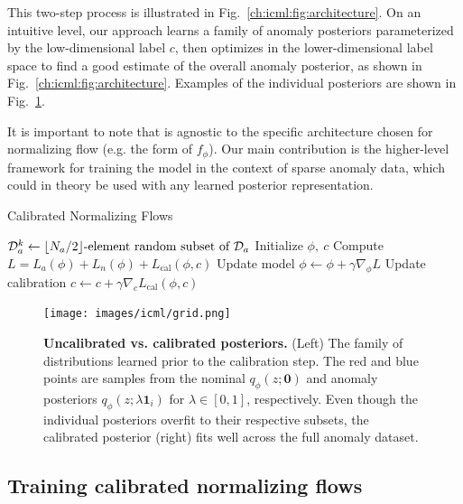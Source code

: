 This two-step process is illustrated in Fig.~\ref{ch:icml:fig:architecture}. On an intuitive level, our approach learns a family of anomaly posteriors parameterized by the low-dimensional label $c$, then optimizes in the lower-dimensional label space to find a good estimate of the overall anomaly posterior, as shown in Fig.~\ref{ch:icml:fig:architecture}. Examples of the individual posteriors are shown in Fig.~\ref{ch:icml:fig:grid}.

It is important to note that \ouralg{} is agnostic to the specific architecture chosen for normalizing flow (e.g. the form of $f_\phi$). Our main contribution is the higher-level framework for training the model in the context of sparse anomaly data, which could in theory be used with any learned posterior representation.

\begin{algorithm}[H]
    \caption{Calibrated Normalizing Flows}
    \label{ch:icml:alg:calnf}
    \DontPrintSemicolon
    {
        $\mathcal{D}_a^k \gets \text{$\lfloor N_a/2 \rfloor$-element random subset of } \mathcal{D}_a$\;
    }
    Initialize $\phi,\ c$\;
    {
        Compute $L = L_a(\phi) + L_n(\phi) + L_{\text{cal}}(\phi, c)$\;
        Update model $\phi \gets \phi + \gamma \nabla_\phi L$\;
        Update calibration $c \gets c + \gamma \nabla_c L_{\text{cal}}(\phi, c)$\;
    }
\end{algorithm}

\begin{figure}[ht]
    \centering
    \texttt{[image: images/icml/grid.png]}
    \caption{\textbf{Uncalibrated vs. calibrated posteriors.} (Left) The family of distributions learned prior to the calibration step. The red and blue points are samples from the nominal $q_\phi(z; \mathbf{0})$ and anomaly posteriors $q_\phi(z; \lambda \mathbf{1}_i)$ for $\lambda \in [0, 1]$, respectively. Even though the individual posteriors overfit to their respective subsets, the calibrated posterior (right) fits well across the full anomaly dataset.}
    \label{ch:icml:fig:grid}
\end{figure}

\subsection{Training calibrated normalizing flows}

